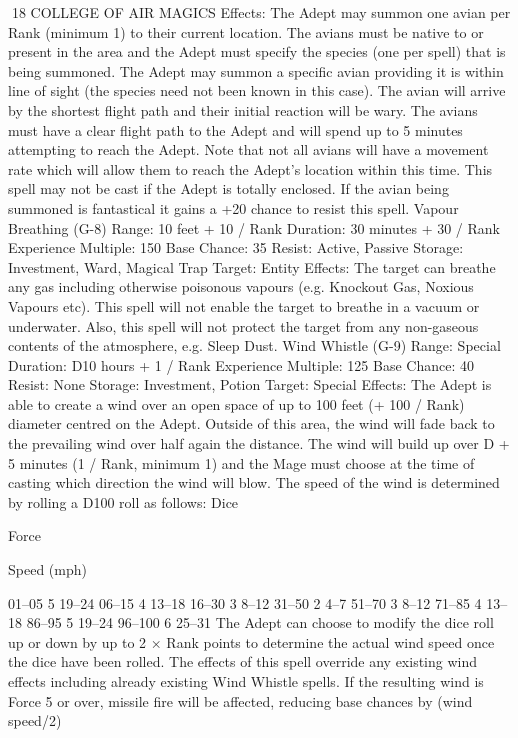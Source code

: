 \documentclass[a4paper]{article}
\begin{document}
\begin{multicols}{3}
18 COLLEGE OF AIR MAGICS
Effects: The Adept may summon one avian per
Rank (minimum 1) to their current location. The
avians must be native to or present in the area and
the Adept must specify the species (one per spell)
that is being summoned. The Adept may summon a
specific avian providing it is within line of sight
(the species need not been known in this case). The
avian will arrive by the shortest flight path and
their initial reaction will be wary. The avians must
have a clear flight path to the Adept and will spend
up to 5 minutes attempting to reach the Adept.
Note that not all avians will have a movement rate
which will allow them to reach the Adept’s location within this time. This spell may not be cast if
the Adept is totally enclosed. If the avian being
summoned is fantastical it gains a +20%
chance to resist this spell.
Vapour Breathing (G-8)
Range: 10 feet + 10 / Rank
Duration: 30 minutes + 30 / Rank
Experience Multiple: 150
Base Chance: 35%
Resist: Active, Passive
Storage: Investment, Ward, Magical Trap
Target: Entity
Effects: The target can breathe any gas including
otherwise poisonous vapours (e.g. Knockout Gas,
Noxious Vapours etc). This spell will not enable
the target to breathe in a vacuum or underwater.
Also, this spell will not protect the target from any
non-gaseous contents of the atmosphere, e.g. Sleep
Dust.
Wind Whistle (G-9)
Range: Special
Duration: D10 hours + 1 / Rank
Experience Multiple: 125
Base Chance: 40%
Resist: None
Storage: Investment, Potion
Target: Special
Effects: The Adept is able to create a wind over an
open space of up to 100 feet (+ 100 / Rank) diameter centred on the Adept. Outside of this area, the
wind will fade back to the prevailing wind over
half again the distance. The wind will build up over
D + 5 minutes (1 / Rank, minimum 1) and the
Mage must choose at the time of casting which
direction the wind will blow. The speed of the
wind is determined by rolling a D100 roll as follows:
Dice

Force

Speed (mph)

01–05
5
19–24
06–15
4
13–18
16–30
3
8–12
31–50
2
4–7
51–70
3
8–12
71–85
4
13–18
86–95
5
19–24
96–100 6
25–31
The Adept can choose to modify the dice roll up or
down by up to 2 × Rank points to determine the
actual wind speed once the dice have been rolled.
The effects of this spell override any existing wind
effects including already existing Wind Whistle
spells.
If the resulting wind is Force 5 or over, missile fire
will be affected, reducing base chances by (wind
speed/2)%


\end{multicols}
\end{document}
